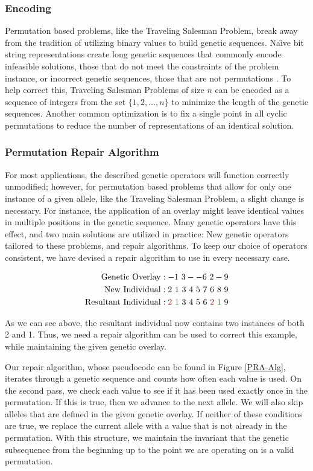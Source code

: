 \subsubsection*{Encoding}
Permutation based problems, like the Traveling Salesman Problem, break away from the tradition of utilizing binary values to build genetic sequences. Na\"{\i}ve bit string representations create long genetic sequences that commonly encode infeasible solutions, those that do not meet the constraints of the problem instance, or incorrect genetic sequences, those that are not permutations \cite{Potvin96}. To help correct this, Traveling Salesman Problems of size $n$ can be encoded as a sequence of integers from the set $\{1, 2, \ldots, n\}$ to minimize the length of the genetic sequences. Another common optimization is to fix a single point in all cyclic permutations to reduce the number of representations of an identical solution. 

\subsubsection*{Permutation Repair Algorithm}
For most applications, the described genetic operators will function correctly unmodified; however, for permutation based problems that allow for only one instance of a given allele, like the Traveling Salesman Problem, a slight change is necessary. For instance, the application of an overlay might leave identical values in multiple positions in the genetic sequence. Many genetic operators have this effect, and two main solutions are utilized in practice: New genetic operators tailored to these problems, and repair algorithms\cite{Larranaga99}. To keep our choice of operators consistent, we have devised a repair algorithm to use in every necessary case.
 
\begin{align*}
\text{Genetic Overlay} &:   -1~3--6~2-9				\\
\text{New Individual} &: 2~1~3~4~5~7~6~8~9			\\		
\text{Resultant Individual} &: {\color{myred}2}~{\color{mygreen}1}~3~4~5~6~{\color{myred}2}~{\color{mygreen}1}~9
\end{align*}

As we can see above, the resultant individual now contains two instances of both 2 and 1. Thus, we need a repair algorithm can be used to correct this example, while maintaining the given genetic overlay. 

Our repair algorithm, whose pseudocode can be found in Figure \ref{PRA-Alg}, iterates through a genetic sequence and counts how often each value is used. On the second pass, we check each value to see if it has been used exactly once in the permutation. If this is true, then we advance to the next allele. We will also skip alleles that are defined in the given genetic overlay. If neither of these conditions are true, we replace the current allele with a value that is not already in the permutation. With this structure, we maintain the invariant that the genetic subsequence from the beginning up to the point we are operating on is a valid permutation.

